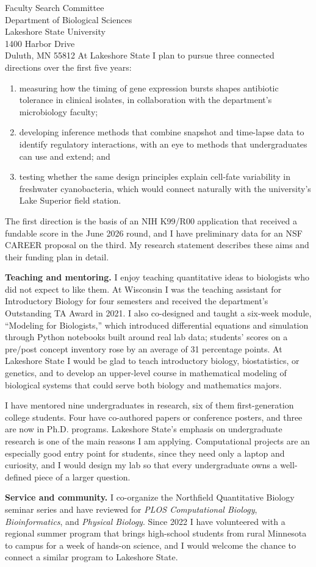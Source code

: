 \documentclass[11pt]{letter}
\begin{document}
\begin{letter}{Faculty Search Committee\\
  Department of Biological Sciences\\
  Lakeshore State University\\
  1400 Harbor Drive\\
  Duluth, MN 55812}
At Lakeshore State I plan to pursue three connected directions over the first five years:
\begin{enumerate}
  \item measuring how the timing of gene expression bursts shapes antibiotic tolerance in clinical isolates, in collaboration with the department's microbiology faculty;
  \item developing inference methods that combine snapshot and time-lapse data to identify regulatory interactions, with an eye to methods that undergraduates can use and extend; and
  \item testing whether the same design principles explain cell-fate variability in freshwater cyanobacteria, which would connect naturally with the university's Lake Superior field station.
\end{enumerate}
The first direction is the basis of an NIH K99/R00 application that received a fundable score in the June 2026 round, and I have preliminary data for an NSF CAREER proposal on the third. My research statement describes these aims and their funding plan in detail.

\textbf{Teaching and mentoring.} I enjoy teaching quantitative ideas to biologists who did not expect to like them. At Wisconsin I was the teaching assistant for Introductory Biology for four semesters and received the department's Outstanding TA Award in 2021. I also co-designed and taught a six-week module, ``Modeling for Biologists,'' which introduced differential equations and simulation through Python notebooks built around real lab data; students' scores on a pre/post concept inventory rose by an average of 31 percentage points. At Lakeshore State I would be glad to teach introductory biology, biostatistics, or genetics, and to develop an upper-level course in mathematical modeling of biological systems that could serve both biology and mathematics majors.

I have mentored nine undergraduates in research, six of them first-generation college students. Four have co-authored papers or conference posters, and three are now in Ph.D. programs. Lakeshore State's emphasis on undergraduate research is one of the main reasons I am applying. Computational projects are an especially good entry point for students, since they need only a laptop and curiosity, and I would design my lab so that every undergraduate owns a well-defined piece of a larger question.

\textbf{Service and community.} I co-organize the Northfield Quantitative Biology seminar series and have reviewed for \emph{PLOS Computational Biology}, \emph{Bioinformatics}, and \emph{Physical Biology}. Since 2022 I have volunteered with a regional summer program that brings high-school students from rural Minnesota to campus for a week of hands-on science, and I would welcome the chance to connect a similar program to Lakeshore State.


\end{letter}
\end{document}

